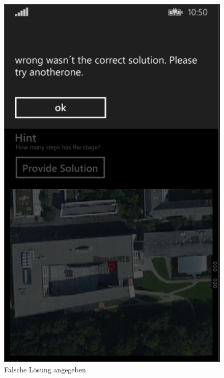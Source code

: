 \documentclass[a4paper,ngerman]{scrartcl}
\begin{document}
\begin{figure}[h]
\centering
\includegraphics[width=.95\textwidth]{images/routeSolutionPage_Failed}
\caption{Falsche Lösung angegeben}
\end{figure}
\end{document}
